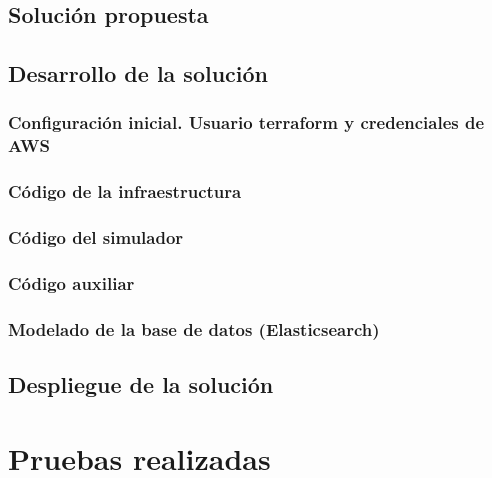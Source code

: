 \documentclass[12pt]{article}
\begin{document}
\subsection{Solución propuesta}



\subsection{Desarrollo de la solución}
\subsubsection{Configuración inicial. Usuario terraform y credenciales de AWS}


\subsubsection{Código de la infraestructura}


\subsubsection{Código del simulador}


\subsubsection{Código auxiliar}


\subsubsection{Modelado de la base de datos (Elasticsearch)}


\subsection{Despliegue de la solución}


\section{Pruebas realizadas}

\end{document}

